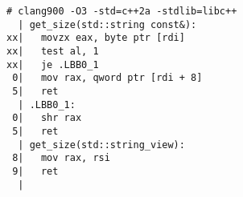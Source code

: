\begin{lstlisting}[language={},numbers=none,title=\href{https://godbolt.org/z/Yc1hrj}{\texttt{godbolt.org/z/Yc1hrj}}]
# clang900 -O3 -std=c++2a -stdlib=libc++
  | get_size(std::string const&):
xx|   movzx eax, byte ptr [rdi]
xx|   test al, 1
xx|   je .LBB0_1
 0|   mov rax, qword ptr [rdi + 8]
 5|   ret
  | .LBB0_1:
 0|   shr rax
 5|   ret
  | get_size(std::string_view):
 8|   mov rax, rsi
 9|   ret
  |
\end{lstlisting}
